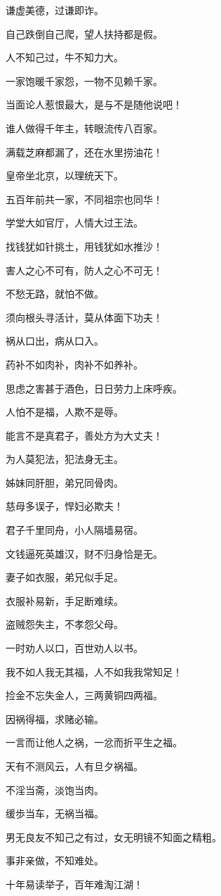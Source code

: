\documentclass[12pt,oneside]{book}
\begin{document}
谦虚美德，过谦即诈。

自己跌倒自己爬，望人扶持都是假。

人不知己过，牛不知力大。

一家饱暖千家怨，一物不见赖千家。

当面论人惹恨最大，是与不是随他说吧！

谁人做得千年主，转眼流传八百家。

满载芝麻都漏了，还在水里捞油花！

皇帝坐北京，以理统天下。

五百年前共一家，不同祖宗也同华！

学堂大如官厅，人情大过王法。

找钱犹如针挑土，用钱犹如水推沙！

害人之心不可有，防人之心不可无！

不愁无路，就怕不做。

须向根头寻活计，莫从体面下功夫！

祸从口出，病从口入。

药补不如肉补，肉补不如养补。

思虑之害甚于酒色，日日劳力上床呼疾。

人怕不是福，人欺不是辱。

能言不是真君子，善处方为大丈夫！

为人莫犯法，犯法身无主。

姊妹同肝胆，弟兄同骨肉。

慈母多误子，悍妇必欺夫！

君子千里同舟，小人隔墙易宿。

文钱逼死英雄汉，财不归身恰是无。

妻子如衣服，弟兄似手足。

衣服补易新，手足断难续。

盗贼怨失主，不孝怨父母。

一时劝人以口，百世劝人以书。

我不如人我无其福，人不如我我常知足！

捡金不忘失金人，三两黄铜四两福。

因祸得福，求赌必输。

一言而让他人之祸，一忿而折平生之福。

天有不测风云，人有旦夕祸福。

不淫当斋，淡饱当肉。

缓歩当车，无祸当福。

男无良友不知己之有过，女无明镜不知面之精粗。

事非亲做，不知难处。

十年易读举子，百年难淘江湖！
\end{document}
